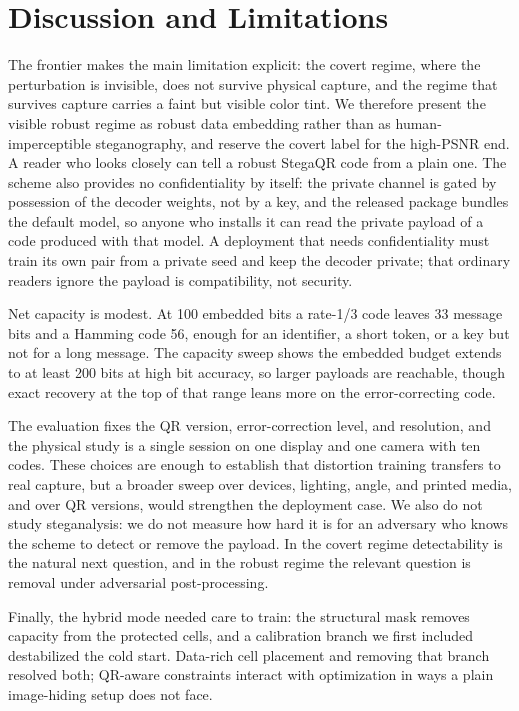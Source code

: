 \documentclass[conference]{IEEEtran}
\begin{document}
\section{Discussion and Limitations}
The frontier makes the main limitation explicit: the covert regime, where
the perturbation is invisible, does not survive physical capture, and the regime that
survives capture carries a faint but visible color tint. We therefore present the visible
robust regime as robust data embedding rather than as human-imperceptible steganography,
and reserve the covert label for the high-PSNR end. A reader who looks closely can tell a
robust StegaQR code from a plain one. The scheme also provides no confidentiality by
itself: the private channel is gated by possession of the decoder weights, not by a key,
and the released package bundles the default model, so anyone who installs it can read
the private payload of a code produced with that model. A deployment that needs
confidentiality must train its own pair from a private seed and keep the decoder
private; that ordinary readers ignore the payload is compatibility, not security.

Net capacity is modest. At 100 embedded bits a rate-1/3 code leaves 33 message bits and a
Hamming code 56, enough for an identifier, a short token, or a key but not for a long
message. The capacity sweep shows the embedded budget extends to at least 200 bits at
high bit accuracy, so larger payloads are reachable, though exact recovery at the top of
that range leans more on the error-correcting code.

The evaluation fixes the QR version, error-correction level, and resolution, and the
physical study is a single session on one display and one camera with ten codes. These
choices are enough to establish that distortion training transfers to real capture, but a
broader sweep over devices, lighting, angle, and printed media, and over QR versions, would
strengthen the deployment case. We also do not study steganalysis: we do not measure how
hard it is for an adversary who knows the scheme to detect or remove the payload. In the
covert regime detectability is the natural next question, and in the robust regime the
relevant question is removal under adversarial post-processing.

Finally, the hybrid mode needed care to train: the structural mask removes capacity from
the protected cells, and a calibration branch we first included destabilized the cold
start. Data-rich cell placement and removing that branch resolved both; QR-aware
constraints interact with optimization in ways a plain image-hiding setup does not face.
\end{document}
